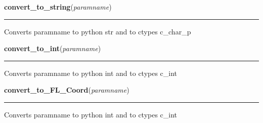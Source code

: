    \label{xformslib:library:convert_to_string}

    \vspace{0.5ex}

\hspace{.8\funcindent}\begin{boxedminipage}{\funcwidth}

    \raggedright \textbf{convert\_to\_string}(\textit{paramname})

    \vspace{-1.5ex}

    \rule{\textwidth}{0.5\fboxrule}
\setlength{\parskip}{2ex}
    Converts paramname to python str and to ctypes c\_char\_p

\setlength{\parskip}{1ex}
    \end{boxedminipage}

    \label{xformslib:library:convert_to_int}

    \vspace{0.5ex}

\hspace{.8\funcindent}\begin{boxedminipage}{\funcwidth}

    \raggedright \textbf{convert\_to\_int}(\textit{paramname})

    \vspace{-1.5ex}

    \rule{\textwidth}{0.5\fboxrule}
\setlength{\parskip}{2ex}
    Converts paramname to python int and to ctypes c\_int

\setlength{\parskip}{1ex}
    \end{boxedminipage}

    \label{xformslib:library:convert_to_int}

    \vspace{0.5ex}

\hspace{.8\funcindent}\begin{boxedminipage}{\funcwidth}

    \raggedright \textbf{convert\_to\_FL\_Coord}(\textit{paramname})

    \vspace{-1.5ex}

    \rule{\textwidth}{0.5\fboxrule}
\setlength{\parskip}{2ex}
    Converts paramname to python int and to ctypes c\_int

\setlength{\parskip}{1ex}
    \end{boxedminipage}


